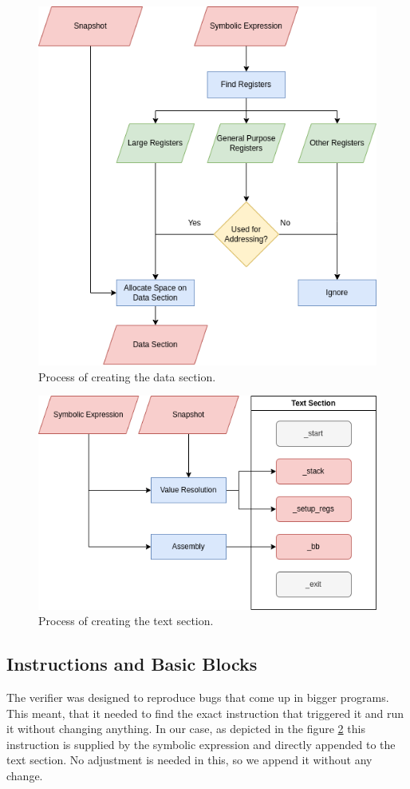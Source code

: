 \begin{figure}[ht]
    \centering
    \includegraphics[width=0.8\linewidth]{figures/data}
    \caption{Process of creating the data section.}
    \label{fig:data}
\end{figure}

\begin{figure}[ht]
    \centering
    \includegraphics[width=0.8\linewidth]{figures/text}
    \caption{Process of creating the text section.}
    \label{fig:text}
\end{figure}

\subsection{Instructions and Basic Blocks}
The verifier was designed to reproduce bugs that come up in bigger programs.
This meant, that it needed to find the exact instruction that triggered it and run it without changing anything.
In our case, as depicted in the figure \ref{fig:text} this instruction is supplied by the symbolic expression and directly appended to the text section.
No adjustment is needed in this, so we append it without any change.

